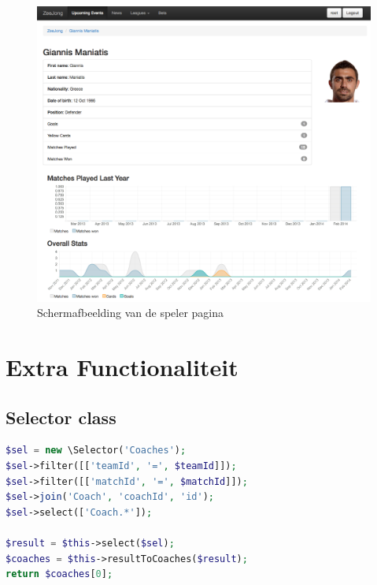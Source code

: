 \documentclass[11pt]{article}
\begin{document}
\begin{figure}[h!]
	\begin{center}
	\includegraphics[scale=0.29]{player.png}

	\caption{Schermafbeelding van de speler pagina}
	\label{fig:speler}
	\end{center}
\end{figure}





\section{Extra Functionaliteit}


\subsection{Selector class}



\begin{framed}
\begin{lstlisting}[language=php]
$sel = new \Selector('Coaches');
$sel->filter([['teamId', '=', $teamId]]);
$sel->filter([['matchId', '=', $matchId]]);
$sel->join('Coach', 'coachId', 'id');
$sel->select(['Coach.*']);

$result = $this->select($sel);
$coaches = $this->resultToCoaches($result);
return $coaches[0];
\end{lstlisting}
\end{framed}
\end{document}
